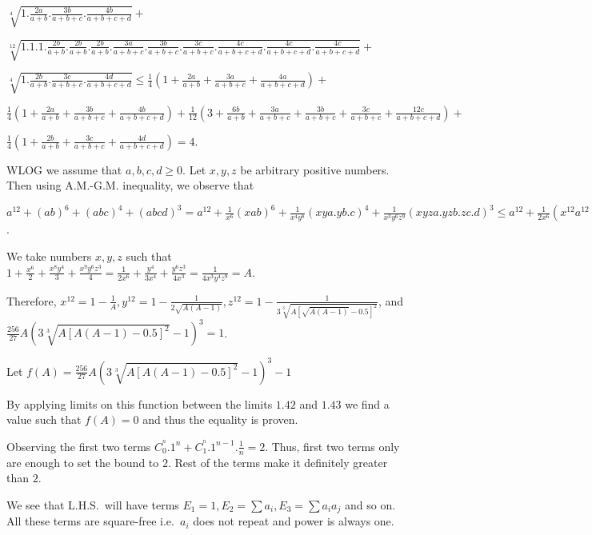   $\sqrt[4]{1.\frac{2a}{a + b}.\frac{3b}{a + b + c}.\frac{4b}{a + b + c + d}} +$

  $\sqrt[12]{1.1.1. \frac{2b}{a +
    b}.\frac{2b}{a + b}.\frac{2b}{a + b}.\frac{3a}{a + b + c}.\frac{3b}{a + b + c}.\frac{3c}{a + b +
    c}. \frac{4c}{a + b + c + d}. \frac{4c}{a + b + c + d}. \frac{4c}{a + b + c + d}} +$

  $\sqrt[4]{1.\frac{2b}{a + b} . \frac{3c}{a + b + c} . \frac{4d}{a + b + c + d}}\leq\frac{1}{4}\left(1 +
  \frac{2a}{a + b} + \frac{3a}{a + b + c} + \frac{4a}{a + b + c + d}\right) +$

  $\frac{1}{4}\left(1 + \frac{2a}{a + b} + \frac{3b}{a + b + c} + \frac{4b}{a + b + c + d}\right) +
  \frac{1}{12}\left(3 + \frac{6b}{a + b} + \frac{3a}{a + b + c} + \frac{3b}{a + b + c} + \frac{3c}{a + b +
    c} + \frac{12c}{a + b + c + d}\right) +$

  $\frac{1}{4}\left(1 + \frac{2b}{a + b} + \frac{3c}{a + b + c} + \frac{4d}{a + b + c + d}\right) = 4$.
\item WLOG we assume that $a, b, c, d\geq 0$. Let $x, y, z$ be arbitrary positive numbers. Then using
  A.M.-G.M. inequality, we observe that

  $a^{12} + (ab)^6 + (abc)^4 + (abcd)^3 = a^{12} + \frac{1}{x^6}(xab)^6 + \frac{1}{x^4y^8}(xya.yb.c)^4 +
  \frac{1}{x^3y^6z^9}(xyza.yzb.zc.d)^3\leq a^{12} + \frac{1}{2x^6}(x^{12}a^{12} + b^{12}) +
  \frac{1}{3x^4y^8}(x^{12}y^{12}a^{12} + y^{12}b^{12} + c^{12}) +
  \frac{1}{4x^3y^6z^9}(x^{12}y^{12}z^{12}a^{12} + y^{12}z^{12}b^{12} + z^{12}c^{12} + d^{12}) = A(a^{12} +
  b^{12} + c^{12} + d^{12})$.

  We take numbers $x, y, z$ such that $1 + \frac{x^6}{2} + \frac{x^8y^4}{3} + \frac{x^9y^6z^3}{4} =
  \frac{1}{2x^6} + \frac{y^4}{3x^4} + \frac{y^6z^3}{4x^3} = \frac{1}{4x^3y^4z^9} = A$.

  Therefore, $x^{12} = 1 - \frac{1}{A}, y^{12} = 1 - \frac{1}{2\sqrt{A(A - 1)}}, z^{12} = 1 -
  \frac{1}{3\sqrt[3]{A[\sqrt{A(A - 1)} - 0.5]^2}}$, and $\frac{256}{27}A\left(3\sqrt[3]{A[A(A - 1) - 0.5]^2}
  - 1\right)^3 = 1$.

  Let $f(A) = \frac{256}{27}A\left(3\sqrt[3]{A[A(A - 1) - 0.5]^2} - 1\right)^3 - 1$

  By applying limits on this function between the limits $1.42$ and $1.43$ we find a value such that $f(A) =
  0$ and thus the equality is proven.
\item Observing the first two terms $C_0^^n.1^n + C_1^^n.1^{n - 1}.\frac{1}{n} = 2$. Thus, first two terms
  only are enough to set the bound to $2$. Rest of the terms make it definitely greater than $2$.
\item We see that L.H.S.\ will have terms $E_1 = 1, E_2 = \sum a_i, E_3 = \sum a_ia_j$ and so on. All these
  terms are square-free i.e.\ $a_i$ does not repeat and power is always one.

